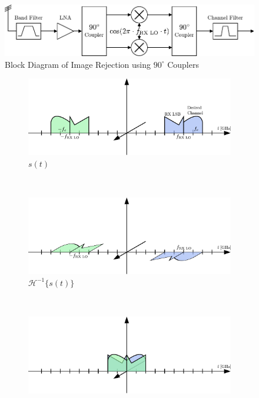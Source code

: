 \begin{figure}[h!]
  \centering
  \includegraphics[width=\textwidth]{figures/rx_rf_1_bd}
  \caption{Block Diagram of Image Rejection using $90^\circ$ Couplers}
  \label{fig:rx_rf_1_bd}
\end{figure}

\begin{figure}[h!]
  \centering
  \begin{subfigure}{0.45\textwidth}
    \centering
    \includegraphics[width=\textwidth]{figures/rx_rf_1_freq_s}
    \caption{$s(t)$}
    \label{fig:rx_rf_1_freq_s}
  \end{subfigure}
  ~
  \begin{subfigure}{0.45\textwidth}
    \centering
    \includegraphics[width=\textwidth]{figures/rx_rf_1_freq_Hs}
    \caption{$\mathcal{H}^{-1}\{s(t)\}$}
    \label{fig:rx_rf_1_freq_Hs}
  \end{subfigure}
  \vspace{4ex} \\
  \begin{subfigure}{0.45\textwidth}
    \centering
    \includegraphics[width=\textwidth]{figures/rx_rf_1_freq_a}

\end{subfigure}
\end{figure}
